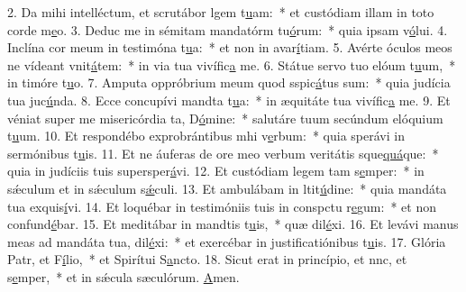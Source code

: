2. Da mihi intelléctum, et scrutábor lgem t\uline{u}am:~* et custódiam illam in toto corde m\uline{e}o.
3. Deduc me in sémitam mandatórm tu\uline{ó}rum:~* quia ipsam v\uline{ó}lui.
4. Inclína cor meum in testimóna t\uline{u}a:~* et non in avar\uline{í}tiam.
5. Avérte óculos meos ne vídeant vnit\uline{á}tem:~* in via tua vivífic\uline{a} me.
6. Státue servo tuo elóum t\uline{u}um,~* in timóre t\uline{u}o.
7. Amputa oppróbrium meum quod sspic\uline{á}tus sum:~* quia judícia tua juc\uline{ú}nda.
8. Ecce concupívi mandta t\uline{u}a:~* in æquitáte tua vivífic\uline{a} me.
9. Et véniat super me misericórdia ta, D\uline{ó}mine:~* salutáre tuum secúndum elóquium t\uline{u}um.
10. Et respondébo exprobrántibus mhi v\uline{e}rbum:~* quia sperávi in sermónibus t\uline{u}is.
11. Et ne áuferas de ore meo verbum veritátis sque\uline{quá}que:~* quia in judíciis tuis supersper\uline{á}vi.
12. Et custódiam legem tam s\uline{e}mper:~* in sǽculum et in sǽculum s\uline{ǽ}culi.
13. Et ambulábam in ltit\uline{ú}dine:~* quia mandáta tua exquis\uline{í}vi.
14. Et loquébar in testimóniis tuis in conspctu r\uline{e}gum:~* et non confund\uline{é}bar.
15. Et meditábar in mandtis t\uline{u}is,~* quæ dil\uline{é}xi.
16. Et levávi manus meas ad mandáta tua,  dil\uline{é}xi:~* et exercébar in justificatiónibus t\uline{u}is.
17. Glória Patr, et F\uline{í}lio,~* et Spirítui S\uline{a}ncto.
18. Sicut erat in princípio, et nnc, et s\uline{e}mper,~* et in sǽcula sæculórum. \uline{A}men.
